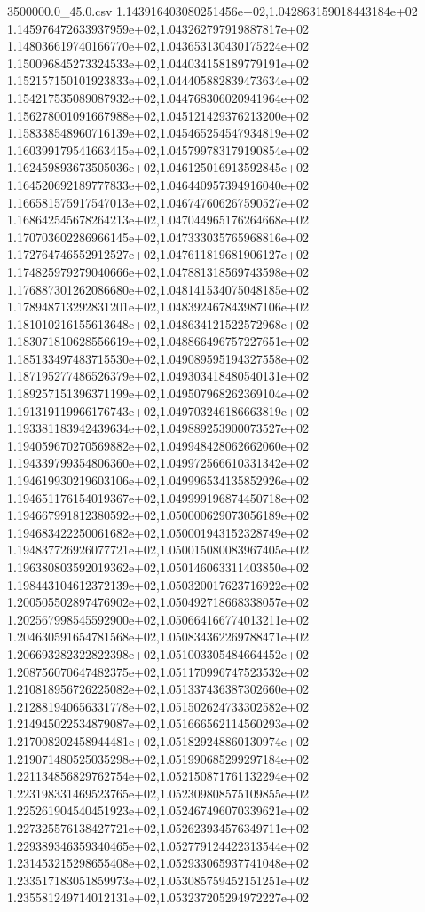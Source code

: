 \begin{filecontents*}{3500000.0_45.0.csv}
1.143916403080251456e+02,1.042863159018443184e+02
1.145976472633937959e+02,1.043262797919887817e+02
1.148036619740166770e+02,1.043653130430175224e+02
1.150096845273324533e+02,1.044034158189779191e+02
1.152157150101923833e+02,1.044405882839473634e+02
1.154217535089087932e+02,1.044768306020941964e+02
1.156278001091667988e+02,1.045121429376213200e+02
1.158338548960716139e+02,1.045465254547934819e+02
1.160399179541663415e+02,1.045799783179190854e+02
1.162459893673505036e+02,1.046125016913592845e+02
1.164520692189777833e+02,1.046440957394916040e+02
1.166581575917547013e+02,1.046747606267590527e+02
1.168642545678264213e+02,1.047044965176264668e+02
1.170703602286966145e+02,1.047333035765968816e+02
1.172764746552912527e+02,1.047611819681906127e+02
1.174825979279040666e+02,1.047881318569743598e+02
1.176887301262086680e+02,1.048141534075048185e+02
1.178948713292831201e+02,1.048392467843987106e+02
1.181010216155613648e+02,1.048634121522572968e+02
1.183071810628556619e+02,1.048866496757227651e+02
1.185133497483715530e+02,1.049089595194327558e+02
1.187195277486526379e+02,1.049303418480540131e+02
1.189257151396371199e+02,1.049507968262369104e+02
1.191319119966176743e+02,1.049703246186663819e+02
1.193381183942439634e+02,1.049889253900073527e+02
1.194059670270569882e+02,1.049948428062662060e+02
1.194339799354806360e+02,1.049972566610331342e+02
1.194619930219603106e+02,1.049996534135852926e+02
1.194651176154019367e+02,1.049999196874450718e+02
1.194667991812380592e+02,1.050000629073056189e+02
1.194683422250061682e+02,1.050001943152328749e+02
1.194837726926077721e+02,1.050015080083967405e+02
1.196380803592019362e+02,1.050146063311403850e+02
1.198443104612372139e+02,1.050320017623716922e+02
1.200505502897476902e+02,1.050492718668338057e+02
1.202567998545592900e+02,1.050664166774013211e+02
1.204630591654781568e+02,1.050834362269788471e+02
1.206693282322822398e+02,1.051003305484664452e+02
1.208756070647482375e+02,1.051170996747523532e+02
1.210818956726225082e+02,1.051337436387302660e+02
1.212881940656331778e+02,1.051502624733302582e+02
1.214945022534879087e+02,1.051666562114560293e+02
1.217008202458944481e+02,1.051829248860130974e+02
1.219071480525035298e+02,1.051990685299297184e+02
1.221134856829762754e+02,1.052150871761132294e+02
1.223198331469523765e+02,1.052309808575109855e+02
1.225261904540451923e+02,1.052467496070339621e+02
1.227325576138427721e+02,1.052623934576349711e+02
1.229389346359340465e+02,1.052779124422313544e+02
1.231453215298655408e+02,1.052933065937741048e+02
1.233517183051859973e+02,1.053085759452151251e+02
1.235581249714012131e+02,1.053237205294972227e+02

\end{filecontents*}
